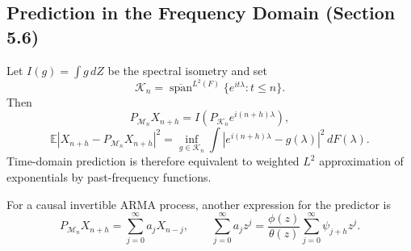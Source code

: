 \subsection{Prediction in the Frequency Domain (Section 5.6)}
\begin{theorem}
Let $I(g)=\int g\,dZ$ be the spectral isometry and set
\[
\mathcal K_n=\overline{\operatorname{span}}^{L^2(F)}
\{e^{it\lambda}:t\le n\}.
\]
Then
\[
P_{\mathcal M_n}X_{n+h}=I(P_{\mathcal K_n}e^{i(n+h)\lambda}),
\]
\[
\mathbb E|X_{n+h}-P_{\mathcal M_n}X_{n+h}|^2
=\inf_{g\in\mathcal K_n}\int|e^{i(n+h)\lambda}-g(\lambda)|^2\,dF(\lambda).
\]
Time-domain prediction is therefore equivalent to weighted $L^2$
approximation of exponentials by past-frequency functions.
\end{theorem}
For a causal invertible ARMA process, another expression for the predictor is
\[
P_{\mathcal M_n}X_{n+h}=\sum_{j=0}^{\infty}a_jX_{n-j},\qquad
\sum_{j=0}^{\infty}a_jz^j=
\frac{\phi(z)}{\theta(z)}\sum_{j=0}^{\infty}\psi_{j+h}z^j.
\]

